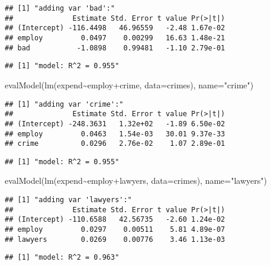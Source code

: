 \documentclass[
  11pt,
]{article}
\newenvironment{Shaded}{\begin{snugshade}}{\end{snugshade}}
\newcommand{\AttributeTok}[1]{\textcolor[rgb]{0.77,0.63,0.00}{#1}}
\newcommand{\FunctionTok}[1]{\textcolor[rgb]{0.00,0.00,0.00}{#1}}
\newcommand{\NormalTok}[1]{#1}
\newcommand{\SpecialCharTok}[1]{\textcolor[rgb]{0.00,0.00,0.00}{#1}}
\newcommand{\StringTok}[1]{\textcolor[rgb]{0.31,0.60,0.02}{#1}}
\begin{document}
\begin{verbatim}
## [1] "adding var 'bad':"
##              Estimate Std. Error t value Pr(>|t|)
## (Intercept) -116.4498   46.96559   -2.48 1.67e-02
## employ         0.0497    0.00299   16.63 1.48e-21
## bad           -1.0898    0.99481   -1.10 2.79e-01
\end{verbatim}

\begin{verbatim}
## [1] "model: R^2 = 0.955"
\end{verbatim}

\begin{Shaded}
\begin{Highlighting}[]
\FunctionTok{evalModel}\NormalTok{(}\FunctionTok{lm}\NormalTok{(expend}\SpecialCharTok{\textasciitilde{}}\NormalTok{employ}\SpecialCharTok{+}\NormalTok{crime, }\AttributeTok{data=}\NormalTok{crimes), }\AttributeTok{name=}\StringTok{"crime"}\NormalTok{)}
\end{Highlighting}
\end{Shaded}

\begin{verbatim}
## [1] "adding var 'crime':"
##              Estimate Std. Error t value Pr(>|t|)
## (Intercept) -248.3631   1.32e+02   -1.89 6.50e-02
## employ         0.0463   1.54e-03   30.01 9.37e-33
## crime          0.0296   2.76e-02    1.07 2.89e-01
\end{verbatim}

\begin{verbatim}
## [1] "model: R^2 = 0.955"
\end{verbatim}

\begin{Shaded}
\begin{Highlighting}[]
\FunctionTok{evalModel}\NormalTok{(}\FunctionTok{lm}\NormalTok{(expend}\SpecialCharTok{\textasciitilde{}}\NormalTok{employ}\SpecialCharTok{+}\NormalTok{lawyers, }\AttributeTok{data=}\NormalTok{crimes), }\AttributeTok{name=}\StringTok{"lawyers"}\NormalTok{)}
\end{Highlighting}
\end{Shaded}

\begin{verbatim}
## [1] "adding var 'lawyers':"
##              Estimate Std. Error t value Pr(>|t|)
## (Intercept) -110.6588   42.56735   -2.60 1.24e-02
## employ         0.0297    0.00511    5.81 4.89e-07
## lawyers        0.0269    0.00776    3.46 1.13e-03
\end{verbatim}

\begin{verbatim}
## [1] "model: R^2 = 0.963"
\end{verbatim}
\end{document}

